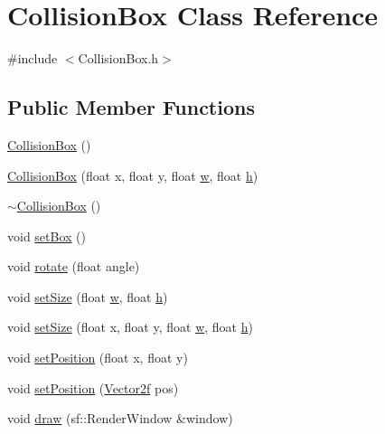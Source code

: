 \hypertarget{class_collision_box}{}\section{Collision\+Box Class Reference}
\label{class_collision_box}


{\ttfamily \#include $<$Collision\+Box.\+h$>$}

\subsection*{Public Member Functions}
\begin{DoxyCompactItemize}
\item 
\mbox{\hyperlink{class_collision_box_a11e887724dd21a42caa87411018de342}{Collision\+Box}} ()
\item 
\mbox{\hyperlink{class_collision_box_a0a5bd8a87ad2d2efd445588e5b568edc}{Collision\+Box}} (float x, float y, float \mbox{\hyperlink{class_collision_box_ac04317c3ca9bc133a784f414066e569c}{w}}, float \mbox{\hyperlink{class_collision_box_ab46fbe0c72f6c67074798ec6c926bd6a}{h}})
\item 
\mbox{\hyperlink{class_collision_box_aeb743d5c3c5b54d2648281a4782f8a40}{$\sim$\+Collision\+Box}} ()
\item 
void \mbox{\hyperlink{class_collision_box_aca6fcbadbe589886e9170374420e02b8}{set\+Box}} ()
\item 
void \mbox{\hyperlink{class_collision_box_a20fa84f0bba29e6f80eeb0e087d54043}{rotate}} (float angle)
\item 
void \mbox{\hyperlink{class_collision_box_a548872339aca0b62d4f515ac7378e864}{set\+Size}} (float \mbox{\hyperlink{class_collision_box_ac04317c3ca9bc133a784f414066e569c}{w}}, float \mbox{\hyperlink{class_collision_box_ab46fbe0c72f6c67074798ec6c926bd6a}{h}})
\item 
void \mbox{\hyperlink{class_collision_box_a5f75f1544e0f08e1c218a1616150d1c8}{set\+Size}} (float x, float y, float \mbox{\hyperlink{class_collision_box_ac04317c3ca9bc133a784f414066e569c}{w}}, float \mbox{\hyperlink{class_collision_box_ab46fbe0c72f6c67074798ec6c926bd6a}{h}})
\item 
void \mbox{\hyperlink{class_collision_box_a24bf7c5f74f474eea1669f7422c5ecf7}{set\+Position}} (float x, float y)
\item 
void \mbox{\hyperlink{class_collision_box_a7a4b85f70e3d2d5ae5b8df7aade248fb}{set\+Position}} (\mbox{\hyperlink{class_vector2f}{Vector2f}} pos)
\item 
void \mbox{\hyperlink{class_collision_box_a6063d25f96262043ed68493a8f1152e6}{draw}} (sf\+::\+Render\+Window \&window)
\end{DoxyCompactItemize}
